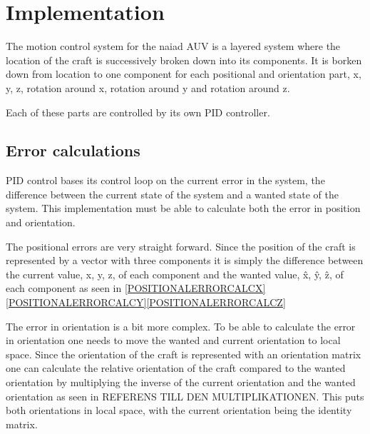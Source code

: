 \section{Implementation}\label{sec:implementation}

The motion control system for the naiad AUV is a layered system where the location of the craft is successively broken down into its components. It is borken down from location to one component for each positional and orientation part, x, y, z, rotation around x, rotation around y and rotation around z. 

Each of these parts are controlled by its own PID controller.

\subsection{Error calculations}
PID control bases its control loop on the current error in the system, the difference between the current state of the system and a wanted state of the system. This implementation must be able to calculate both the error in position and orientation.

The positional errors are very straight forward. Since the position of the craft is represented by a vector with three components it is simply the difference between the current value, x, y, z, of each component and the wanted value, \^x, \^y, \^z, of each component as seen in \eqref{POSITIONALERRORCALCX}\eqref{POSITIONALERRORCALCY}\eqref{POSITIONALERRORCALCZ}


The error in orientation is a bit more complex. To be able to calculate the error in orientation one needs to move the wanted and current orientation to local space. Since the orientation of the craft is represented with an orientation matrix one can calculate the relative orientation of the craft compared to the wanted orientation by multiplying the inverse of the current orientation and the wanted orientation as seen in REFERENS TILL DEN MULTIPLIKATIONEN. This puts both orientations in local space, with the current orientation being the identity matrix.

